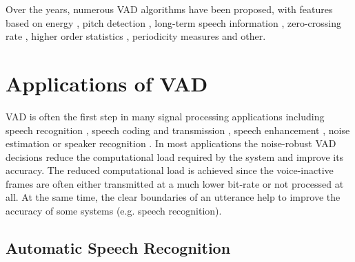 Over the years, numerous VAD algorithms have been proposed, with features based on energy \cite{G729, AMR}, pitch detection \cite{PARADE}, long-term speech information \citep{LTSD}, zero-crossing rate \cite{G729Original}, higher order statistics \cite{HOS}, periodicity measures \cite{periodicity} and other.


\section{Applications of VAD}

VAD is often the first step in many signal processing applications including speech recognition \cite{RamirezGorriz, Kuroiwa, Martin, Shafran, ImprovedLikelihood, LTSD}, speech coding and transmission \cite{Sohn, RamirezGorriz, Prasad, G729, GSMControl}, speech enhancement \cite{Park, RamirezGorriz, Borisagar}, noise estimation \cite{RamirezGorriz} or speaker recognition \cite{Sahidullah}. In most applications the noise-robust VAD decisions reduce the computational load required by the system and improve its accuracy. The reduced computational load is achieved since the voice-inactive frames are often either transmitted at a much lower bit-rate or not processed at all. At the same time, the clear boundaries of an utterance help to improve the accuracy of some systems (e.g. speech recognition).

\subsection{Automatic Speech Recognition}

